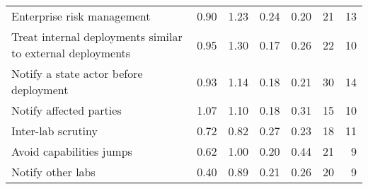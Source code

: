 \documentclass{article}
\begin{document}
\begin{sidewaystable}
\begin{tabular}{l*{6}{r}}
Enterprise risk management & 0.90 & 1.23 & 0.24 & 0.20 & 21 & 13 \\
Treat internal deployments similar to external deployments & 0.95 & 1.30 & 0.17 & 0.26 & 22 & 10 \\
Notify a state actor before deployment & 0.93 & 1.14 & 0.18 & 0.21 & 30 & 14 \\
Notify affected parties & 1.07 & 1.10 & 0.18 & 0.31 & 15 & 10 \\
Inter-lab scrutiny & 0.72 & 0.82 & 0.27 & 0.23 & 18 & 11 \\
Avoid capabilities jumps & 0.62 & 1.00 & 0.20 & 0.44 & 21 & 9 \\
Notify other labs & 0.40 & 0.89 & 0.21 & 0.26 & 20 & 9 \\
        \bottomrule
    \end{tabular}
\end{sidewaystable}
\end{document}

